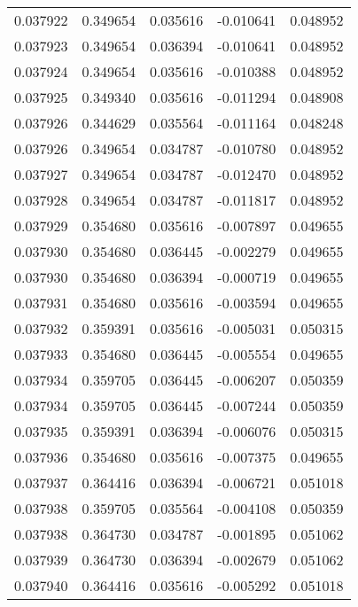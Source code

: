 \begin{tabular}{lrrrr}
0.037922    &  0.349654 &  0.035616 & -0.010641 &             0.048952 \\
0.037923    &  0.349654 &  0.036394 & -0.010641 &             0.048952 \\
0.037924    &  0.349654 &  0.035616 & -0.010388 &             0.048952 \\
0.037925    &  0.349340 &  0.035616 & -0.011294 &             0.048908 \\
0.037926    &  0.344629 &  0.035564 & -0.011164 &             0.048248 \\
0.037926    &  0.349654 &  0.034787 & -0.010780 &             0.048952 \\
0.037927    &  0.349654 &  0.034787 & -0.012470 &             0.048952 \\
0.037928    &  0.349654 &  0.034787 & -0.011817 &             0.048952 \\
0.037929    &  0.354680 &  0.035616 & -0.007897 &             0.049655 \\
0.037930    &  0.354680 &  0.036445 & -0.002279 &             0.049655 \\
0.037930    &  0.354680 &  0.036394 & -0.000719 &             0.049655 \\
0.037931    &  0.354680 &  0.035616 & -0.003594 &             0.049655 \\
0.037932    &  0.359391 &  0.035616 & -0.005031 &             0.050315 \\
0.037933    &  0.354680 &  0.036445 & -0.005554 &             0.049655 \\
0.037934    &  0.359705 &  0.036445 & -0.006207 &             0.050359 \\
0.037934    &  0.359705 &  0.036445 & -0.007244 &             0.050359 \\
0.037935    &  0.359391 &  0.036394 & -0.006076 &             0.050315 \\
0.037936    &  0.354680 &  0.035616 & -0.007375 &             0.049655 \\
0.037937    &  0.364416 &  0.036394 & -0.006721 &             0.051018 \\
0.037938    &  0.359705 &  0.035564 & -0.004108 &             0.050359 \\
0.037938    &  0.364730 &  0.034787 & -0.001895 &             0.051062 \\
0.037939    &  0.364730 &  0.036394 & -0.002679 &             0.051062 \\
0.037940    &  0.364416 &  0.035616 & -0.005292 &             0.051018 \\

\end{tabular}
